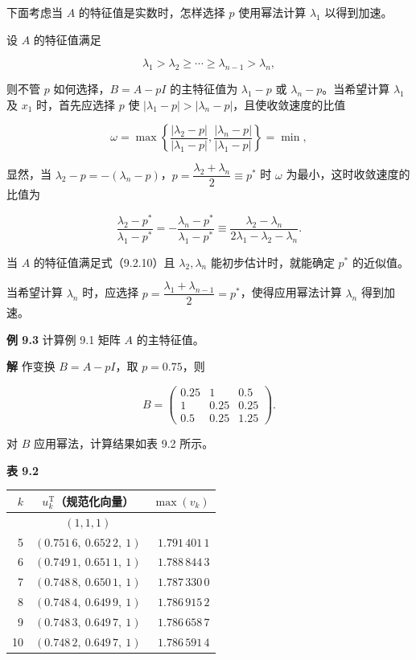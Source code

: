 下面考虑当 \(A\) 的特征值是实数时，怎样选择 \(p\) 使用幂法计算 \(\lambda_1\) 以得到加速。

设 \(A\) 的特征值满足

\[
\lambda_1>\lambda_2\geq\cdots\geq\lambda_{n-1}>\lambda_n,
\tag{9.2.10}
\]

则不管 \(p\) 如何选择，\(B=A-pI\) 的主特征值为 \(\lambda_1-p\) 或 \(\lambda_n-p\)。当希望计算 \(\lambda_1\) 及 \(x_1\) 时，首先应选择 \(p\) 使 \(|\lambda_1-p|>|\lambda_n-p|\)，且使收敛速度的比值

\[
\omega=\max\left\{\frac{|\lambda_2-p|}{|\lambda_1-p|},\frac{|\lambda_n-p|}{|\lambda_1-p|}\right\}=\min,
\]

显然，当 \(\lambda_2-p=-(\lambda_n-p)\)，\(p=\dfrac{\lambda_2+\lambda_n}{2}\equiv p^*\) 时 \(\omega\) 为最小，这时收敛速度的比值为

\[
\frac{\lambda_2-p^*}{\lambda_1-p^*}=-\frac{\lambda_n-p^*}{\lambda_1-p^*}\equiv\frac{\lambda_2-\lambda_n}{2\lambda_1-\lambda_2-\lambda_n}.
\]

当 \(A\) 的特征值满足式（9.2.10）且 \(\lambda_2,\lambda_n\) 能初步估计时，就能确定 \(p^*\) 的近似值。

当希望计算 \(\lambda_n\) 时，应选择 \(p=\dfrac{\lambda_1+\lambda_{n-1}}{2}=p^*\)，使得应用幂法计算 \(\lambda_n\) 得到加速。

\textbf{例 9.3} 计算例 9.1 矩阵 \(A\) 的主特征值。

\textbf{解} 作变换 \(B=A-pI\)，取 \(p=0.75\)，则

\[
B=\begin{pmatrix}
0.25&1&0.5\\
1&0.25&0.25\\
0.5&0.25&1.25
\end{pmatrix}.
\]

对 \(B\) 应用幂法，计算结果如表 9.2 所示。

\textbf{表 9.2}

{\def\LTcaptype{none} %
\begin{longtable}[]{@{}rcr@{}}
\toprule\noalign{}
\(k\) & \(u_k^{\mathrm T}\)（规范化向量） & \(\max(v_k)\) \\
\midrule\noalign{}
\endhead
\bottomrule\noalign{}
\endlastfoot
0 & \((1,1,1)\) & \\
5 & \((0.751\,6,\ 0.652\,2,\ 1)\) & \(1.791\,401\,1\) \\
6 & \((0.749\,1,\ 0.651\,1,\ 1)\) & \(1.788\,844\,3\) \\
7 & \((0.748\,8,\ 0.650\,1,\ 1)\) & \(1.787\,330\,0\) \\
8 & \((0.748\,4,\ 0.649\,9,\ 1)\) & \(1.786\,915\,2\) \\
9 & \((0.748\,3,\ 0.649\,7,\ 1)\) & \(1.786\,658\,7\) \\
10 & \((0.748\,2,\ 0.649\,7,\ 1)\) & \(1.786\,591\,4\) \\
\end{longtable}
}


